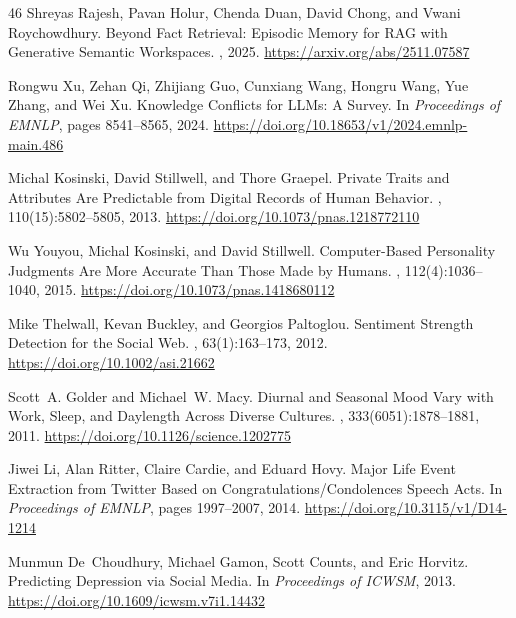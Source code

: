 \documentclass[manuscript,review]{acmart}
\begin{document}
\begin{thebibliography}{46}
Shreyas Rajesh, Pavan Holur, Chenda Duan, David Chong, and Vwani Roychowdhury.
\newblock Beyond Fact Retrieval: Episodic Memory for RAG with Generative Semantic Workspaces.
, 2025.
\newblock \url{https://arxiv.org/abs/2511.07587}

Rongwu Xu, Zehan Qi, Zhijiang Guo, Cunxiang Wang, Hongru Wang, Yue Zhang, and Wei Xu.
\newblock Knowledge Conflicts for LLMs: A Survey.
\newblock In {\em Proceedings of EMNLP}, pages 8541--8565, 2024.
\newblock \url{https://doi.org/10.18653/v1/2024.emnlp-main.486}

Michal Kosinski, David Stillwell, and Thore Graepel.
\newblock Private Traits and Attributes Are Predictable from Digital Records of Human Behavior.
, 110(15):5802--5805, 2013.
\newblock \url{https://doi.org/10.1073/pnas.1218772110}

Wu Youyou, Michal Kosinski, and David Stillwell.
\newblock Computer-Based Personality Judgments Are More Accurate Than Those Made by Humans.
, 112(4):1036--1040, 2015.
\newblock \url{https://doi.org/10.1073/pnas.1418680112}

Mike Thelwall, Kevan Buckley, and Georgios Paltoglou.
\newblock Sentiment Strength Detection for the Social Web.
, 63(1):163--173, 2012.
\newblock \url{https://doi.org/10.1002/asi.21662}

Scott~A. Golder and Michael~W. Macy.
\newblock Diurnal and Seasonal Mood Vary with Work, Sleep, and Daylength Across Diverse Cultures.
, 333(6051):1878--1881, 2011.
\newblock \url{https://doi.org/10.1126/science.1202775}

Jiwei Li, Alan Ritter, Claire Cardie, and Eduard Hovy.
\newblock Major Life Event Extraction from Twitter Based on Congratulations/Condolences Speech Acts.
\newblock In {\em Proceedings of EMNLP}, pages 1997--2007, 2014.
\newblock \url{https://doi.org/10.3115/v1/D14-1214}

Munmun De~Choudhury, Michael Gamon, Scott Counts, and Eric Horvitz.
\newblock Predicting Depression via Social Media.
\newblock In {\em Proceedings of ICWSM}, 2013.
\newblock \url{https://doi.org/10.1609/icwsm.v7i1.14432}


\end{thebibliography}
\end{document}
